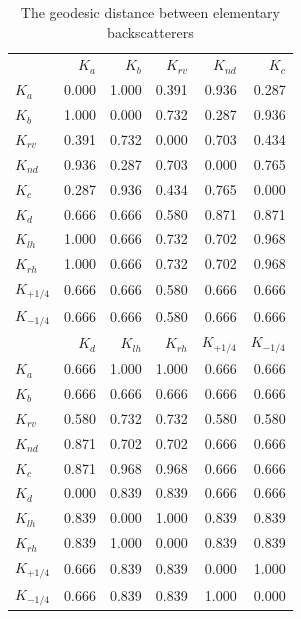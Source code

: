 \documentclass[conference]{IEEEtran}
\begin{document}
\begin{table}[hbt]
\centering
\caption{The geodesic distance between elementary backscatterers}\label{tab:dist_matrix}
\begin{tabular}{lrrrrr}
\toprule
& $K_{a}$ & $K_{b}$ & $K_{rv}$ & $K_{nd}$ & $K_{c}$\\
\cmidrule(lr){2-6}
$K_{a}$ & 0.000 & 1.000 & 0.391 & 0.936 & 0.287\\
$K_{b}$ & 1.000 & 0.000 & 0.732 & 0.287 & 0.936\\
$K_{rv}$ & 0.391 & 0.732 & 0.000 & 0.703 & 0.434\\
$K_{nd}$ & 0.936 & 0.287 & 0.703 & 0.000 & 0.765\\
$K_{c}$ & 0.287 & 0.936 & 0.434 & 0.765 & 0.000\\
$K_{d}$ & 0.666 & 0.666 & 0.580 & 0.871 & 0.871\\
$K_{lh}$ & 1.000 & 0.666 & 0.732 & 0.702 & 0.968\\
$K_{rh}$ & 1.000 & 0.666 & 0.732 & 0.702 & 0.968\\
$K_{+1/4}$ & 0.666 & 0.666 & 0.580 & 0.666 & 0.666\\
$K_{-1/4}$ & 0.666 & 0.666 & 0.580 & 0.666 & 0.666\\
\midrule
& $K_{d}$ & $K_{lh}$ & $K_{rh}$ & $K_{+1/4}$ & $K_{-1/4}$\\
\cmidrule(lr){2-6}
$K_{a}$ & 0.666 & 1.000 & 1.000 & 0.666 & 0.666\\
$K_{b}$ & 0.666 & 0.666 & 0.666 & 0.666 & 0.666\\
$K_{rv}$ & 0.580 & 0.732 & 0.732 & 0.580 & 0.580\\
$K_{nd}$ & 0.871 & 0.702 & 0.702 & 0.666 & 0.666\\
$K_{c}$ & 0.871 & 0.968 & 0.968 & 0.666 & 0.666\\
$K_{d}$ & 0.000 & 0.839 & 0.839 & 0.666 & 0.666\\
$K_{lh}$ & 0.839 & 0.000 & 1.000 & 0.839 & 0.839\\
$K_{rh}$ & 0.839 & 1.000 & 0.000 & 0.839 & 0.839\\
$K_{+1/4}$ & 0.666 & 0.839 & 0.839 & 0.000 & 1.000\\
$K_{-1/4}$ & 0.666 & 0.839 & 0.839 & 1.000 & 0.000\\
\bottomrule
\end{tabular} 
\end{table}
\end{document}
